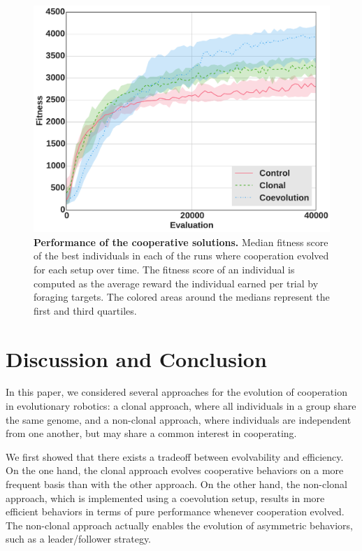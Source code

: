     \begin{figure}[h]
      \begin{center}
        \includegraphics[scale = 0.4]{fig/ArticleRob1/fitnessRecyclingStags.pdf}
        \caption{\textbf{Performance of the cooperative solutions.}
        Median fitness score of the best individuals in each of the runs where cooperation evolved for each setup over time. The fitness score of an individual is computed as the average reward the individual earned per trial by foraging targets. The colored areas around the medians represent the first and third quartiles.}
        \label{fig:RecyclingFitness}
        \end{center}
    \end{figure}

\section{Discussion and Conclusion}

  In this paper, we considered several approaches for the evolution of cooperation in evolutionary robotics: a clonal approach, where all individuals in a group share the same genome, and a non-clonal approach, where individuals are independent from one another, but may share a common interest in cooperating. 

  We first showed that there exists a tradeoff between evolvability and efficiency. On the one hand, the clonal approach evolves cooperative behaviors on a more frequent basis than with the other approach. On the other hand, the non-clonal approach, which is implemented using a coevolution setup, results in more efficient behaviors in terms of pure performance whenever cooperation evolved. The non-clonal approach actually enables the evolution of asymmetric behaviors, such as a leader/follower strategy.

